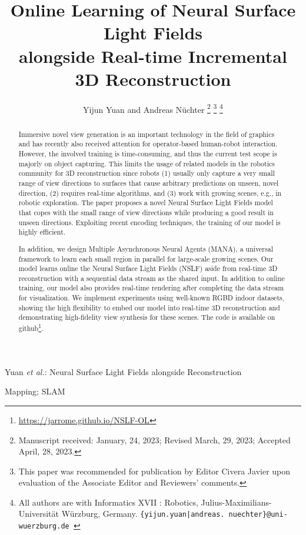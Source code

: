 \documentclass[letterpaper, 10 pt, journal, twoside]{IEEEtran}  %
\title{
  Online Learning of Neural Surface Light Fields\\ alongside Real-time Incremental 3D Reconstruction
}
\author{Yijun Yuan and Andreas N\"uchter%
  \thanks{Manuscript received: January, 24, 2023; Revised March, 29, 2023; Accepted April, 28, 2023.}%
  \thanks{This paper was recommended for publication by Editor Civera Javier upon evaluation of the Associate Editor and Reviewers' comments.}
  \thanks{All authors are with Informatics XVII : Robotics, Julius-Maximilians-Universit\"at W\"urzburg, Germany.
    {\tt\footnotesize \{yijun.yuan|andreas. nuechter\}@uni-wuerzburg.de }}%
}
\begin{document}
\maketitle
{Yuan \MakeLowercase{\textit{et al.}}: Neural Surface Light Fields alongside Reconstruction} 


\begin{abstract}

Immersive novel view generation is an important technology in the field of graphics and has recently also received attention for operator-based human-robot interaction. 
However, the involved training is time-consuming, and thus the current test scope is majorly on object capturing.
This limits the usage of related models in the robotics community for 3D reconstruction since robots (1) usually only capture a very small range of view directions to surfaces that cause arbitrary predictions on unseen, novel direction, (2) requires real-time algorithms, and (3) work with growing scenes, e.g., in robotic exploration.
The paper proposes a novel Neural Surface Light Fields model that copes with the small range of view directions while producing a good result in unseen directions.
Exploiting recent encoding techniques, the training of our model is highly efficient.

In addition, we design Multiple Asynchronous Neural Agents (MANA), a universal framework to learn each small region in parallel for large-scale growing scenes.
Our model learns online the Neural Surface Light Fields (NSLF) aside from real-time 3D reconstruction with a sequential data stream as the shared input.
In addition to online training, our model also provides real-time rendering after completing the data stream for visualization.
We implement experiments using well-known RGBD indoor datasets, showing the high flexibility to embed our model into real-time 3D reconstruction and demonstrating high-fidelity view synthesis for these scenes. The code is available on github\footnote{\url{https://jarrome.github.io/NSLF-OL}}.
\end{abstract}
\begin{IEEEkeywords}
	Mapping; SLAM
\end{IEEEkeywords}
\vspace{-.3cm}





\end{document}

